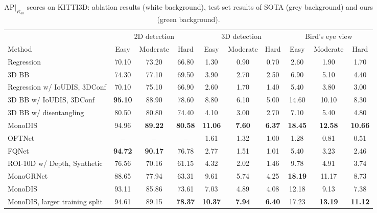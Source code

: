 \documentclass[10pt,twocolumn,letterpaper]{article}
\newcommand{\monodis}{MonoDIS}
\newcommand{\ioudis}{IoUDIS}
\newcommand{\confidence}{3DConf}
\begin{document}
\begin{table*}[t]
    \centering
    {\footnotesize
    \begin{tabular}{l|ccc|ccc|ccc}
        \toprule
        & \multicolumn{3}{c|}{2D detection} & \multicolumn{3}{c|}{3D detection} & \multicolumn{3}{c}{Bird's eye view} \\
        Method & Easy & Moderate & Hard & Easy & Moderate & Hard & Easy & Moderate & Hard \\
        \midrule
        Regression & 70.10 & 73.20 & 66.80 & 1.30 & 0.90 & 0.70 & 2.60 & 1.90 & 1.70 \\
        3D BB & 74.30 & 77.10 & 69.50 & 3.90 & 2.70 & 2.50 & 6.90 & 5.10 & 4.40 \\
        \midrule
        Regression w/ \ioudis, \confidence & 70.10 & 75.10 & 66.90 & 2.60 & 1.70 & 1.40 & 5.40 & 3.80 & 3.00 \\
        3D BB w/ \ioudis, \confidence & \textbf{95.10} & 88.90 & 78.60 & 8.80 & 6.10 & 5.00 & 14.60 & 10.10 & 8.30 \\
        3D BB w/ disentangling & 80.50 & 80.80 & 74.40 & 4.10 & 3.00 & 2.70 & 7.10 & 5.40 & 4.80 \\
        \rowcolor{mapillarygreen}
        \monodis & 94.96 & \textbf{89.22} & \textbf{80.58} & \textbf{11.06} & \textbf{7.60} & \textbf{6.37} & \textbf{18.45} & \textbf{12.58} & \textbf{10.66} \\
        \midrule
        \rowcolor[gray]{\gc}
        OFTNet~\cite{Roddick18} & -- & -- & -- & 1.61 & 1.32 & 1.00 & 1.28 & 0.81 & 0.51 \\
        \rowcolor[gray]{\gc}
        FQNet~\cite{Liu+19} & \textbf{94.72} & \textbf{90.17} & 76.78 & 2.77 & 1.51 & 1.01 & 5.40 & 3.23 & 2.46 \\
        \rowcolor[gray]{\gc}
        ROI-10D w/ Depth, Synthetic~\cite{Manhardt_2019_CVPR} & 76.56 & 70.16 & 61.15 & 4.32 & 2.02 & 1.46 & 9.78 & 4.91 & 3.74 \\
\rowcolor[gray]{\gc}
        MonoGRNet~\cite{qin2019monogrnet} & 88.65 & 77.94 & 63.31 & 9.61 & 5.74 & 4.25 & \textbf{18.19} & 11.17 & 8.73 \\
        \rowcolor{mapillarygreen}
        \monodis{} & 93.11 & 85.86 & 73.61 & 7.03 & 4.89 & 4.08 & 12.18 & 9.13 & 7.38 \\
        \rowcolor{mapillarygreen}
        \monodis{}, larger training split
        & 94.61 & 89.15 & \textbf{78.37} & \textbf{10.37} & \textbf{7.94} & \textbf{6.40} & 17.23 & \textbf{13.19} & \textbf{11.12} \\
        \bottomrule 
    \end{tabular}}
    \vspace{-0.5em}
    \caption{$\text{AP}|_{R_{40}}$ scores on KITTI3D: ablation results (white background), test set results of SOTA (grey background) and ours (green background).}
    \label{tab:ablation-new-metric}
    \vspace{-0.5em}
\end{table*}
\end{document}

